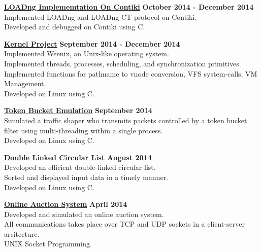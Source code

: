 \documentclass[margin,line]{resume}
\begin{document}
\begin{resume}
    \textbf{\listing \href{https://github.com/bmyfish/LOADng-In-Contiki}{LOADng Implememtation On Contiki}} \hfill \textbf{October 2014 - December 2014}\vspace{1mm}\\
    Implemented LOADng and LOADng-CT protocol on Contiki.\\
    Developed and debugged on Contiki using C.  

    \textbf{\listing \href{https://github.com/bmyfish/Weenix}{Kernel Project}} \hfill \textbf{September 2014 - December 2014}\vspace{2mm}\\
    Implemented Weenix, an Unix-like operating system.\\
	Implemented threads, processes, scheduling, and synchronization primitives.\\
	Implemented functions for pathname to vnode conversion, VFS system-calls, VM Management.\\
	Developed on Linux using C. 

    \textbf{\listing \href{https://github.com/bmyfish/Token_Bucket_Emulation}{Token Bucket Emulation}} \hfill \textbf{September 2014}\vspace{2mm}\\
    Simulated a traffic shaper who transmits packets controlled by a token bucket filter using multi-threading within a single process.\\
    Developed on Linux using C.    

    \textbf{\listing \href{https://github.com/bmyfish/Double_Linked_Circular_List}{Double Linked Circular List}} \hfill \textbf{August 2014}\vspace{2mm}\\
    Developed an efficient double-linked circular list.\\
    Sorted and displayed input data in a timely manner.\\
    Developed on Linux using C.

    \textbf{\listing \href{https://github.com/bmyfish/Online-Auction-System}{Online Auction System}} \hfill \textbf{April 2014}\vspace{2mm}\\
    Developed and simulated an online auction system.\\
    All communications takes place over TCP and UDP sockets in a client-server arcitecture.\\
    UNIX Socket Programming.
    

\end{resume}
\end{document}
